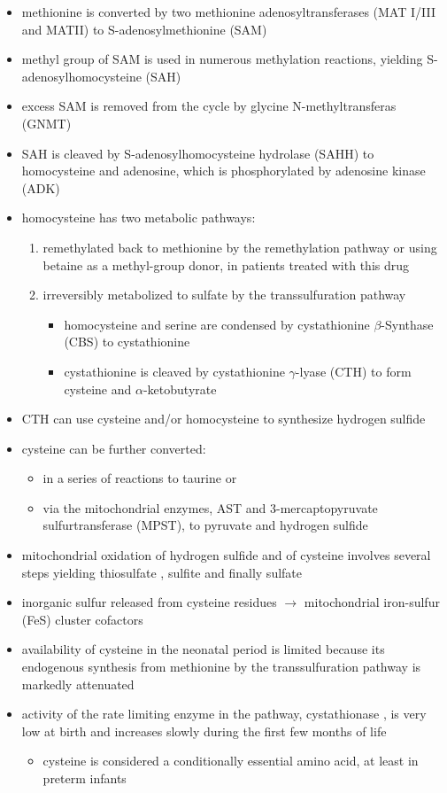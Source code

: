 \documentclass{scrartcl}
\begin{document}
\begin{itemize}
\item methionine is converted by two methionine adenosyltransferases (MAT
I/III and MATII) to S-adenosylmethionine (SAM)
\item methyl group of SAM is used in numerous methylation reactions,
yielding S-adenosylhomocysteine (SAH)
\item excess SAM is removed from the cycle by glycine N-methyltransferas (GNMT)
\item SAH is cleaved by S-adenosylhomocysteine hydrolase (SAHH) to
homocysteine and adenosine, which is phosphorylated by adenosine
kinase (ADK)
\item homocysteine has two metabolic pathways:
\begin{enumerate}
\item remethylated back to methionine by the remethylation pathway or
using betaine as a methyl-group donor, in patients treated with
this drug
\item irreversibly metabolized to sulfate
by the transsulfuration pathway
\begin{itemize}
\item homocysteine and serine are condensed by cystathionine \(\beta\)-Synthase (CBS) to cystathionine
\item cystathionine is cleaved by cystathionine \(\gamma\)-lyase (CTH) to
form cysteine and \(\alpha\)-ketobutyrate
\end{itemize}
\end{enumerate}
\item CTH can use cysteine and/or homocysteine to synthesize hydrogen
sulfide
\item cysteine can be further converted:
\begin{itemize}
\item in a series of reactions to taurine or
\item via the mitochondrial enzymes, AST and 3-mercaptopyruvate
sulfurtransferase (MPST), to pyruvate and hydrogen sulfide
\end{itemize}
\item mitochondrial oxidation of hydrogen sulfide and of cysteine involves
several steps yielding thiosulfate , sulfite and finally sulfate
\item inorganic sulfur released from cysteine residues \(\to\) mitochondrial
iron-sulfur (FeS) cluster cofactors
\item availability of cysteine in the neonatal period is limited because
its endogenous synthesis from methionine by the transsulfuration
pathway is markedly attenuated
\item activity of the rate limiting enzyme in the pathway, cystathionase ,
is very low at birth and increases slowly during the first few months of life
\begin{itemize}
\item cysteine is considered a conditionally essential amino acid, at
least in preterm infants
\end{itemize}


\end{itemize}
\end{document}
